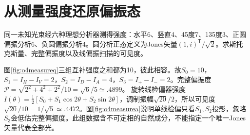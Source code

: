 \section{从测量强度还原偏振态}
\begin{example}\label{ex:o4stokesmeasure}
同一未知光束经六种理想分析器测得强度：水平6、竖直4、45度7、135度3、正圆偏振分析6、负圆偏振分析4。圆分析正态定义为Jones矢量$(1,i)^{\mathsf T}/\sqrt2$。求斯托克斯量、完整偏振度以及线偏振扫描的可见度。
\end{example}
\begin{solution}
图\ref{fig:o4measureq}三组互补强度之和都为10，彼此相容。故$S_0=10$，$S_1=I_H-I_V=2$，$S_2=I_D-I_A=4$，$S_3=I_+-I_-=2$。完整偏振度$\mathcal P=\sqrt{2^2+4^2+2^2}/10=\sqrt6/5\simeq.4899$。
旋转线检偏器强度$I(\theta)=\tfrac12[S_0+S_1\cos2\theta+S_2\sin2\theta]$，调制振幅$\sqrt{20}/2$，所以可见度$\sqrt{20}/10=1/\sqrt5\simeq.4472$。图\ref{fig:o4measurea}说明单线检偏只看$S_1,S_2$投影，忽略$S_3$会低估完整偏振度。此组数据含不可定相的自然成分，不能指定一个唯一Jones矢量代表全部光。
\end{solution}

